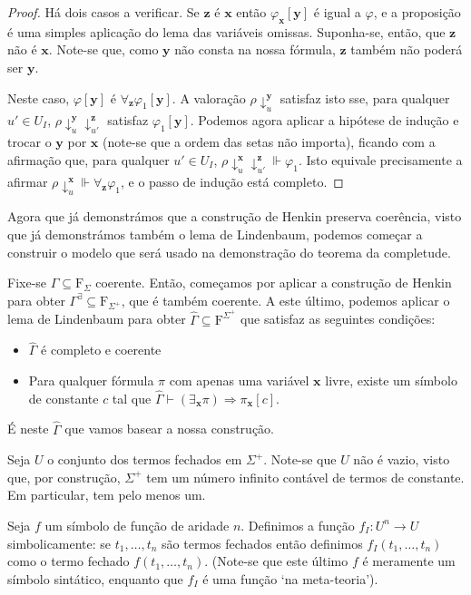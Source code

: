\documentclass{report}
\theoremstyle{definition}
\theoremstyle{remark}
\renewcommand{\bf}[1]{\mathbf{#1}}
\newcommand{\F}{\mathrm{F}}
\newcommand{\imply}{\mathbin{\Rightarrow}}
\begin{document}
\begin{proof}
	Há dois casos a verificar. Se $\bf z$ é $\bf x$ então $\varphi_{\bf x}[\bf y]$ é igual a $\varphi$, e a proposição é uma simples aplicação do lema das variáveis omissas. Suponha-se, então, que $\bf z$ não é $\bf x$. Note-se que, como $\bf y$ não consta na nossa fórmula, $\bf z$ também não poderá ser $\bf y$.

	Neste caso, $\varphi[\bf y]$ é $\forall_{\bf z} \varphi_1[\bf y]$. A valoração $\rho\!\downarrow^{\bf y}_u$ satisfaz isto sse, para qualquer $u' \in U_I$, $\rho\!\downarrow^{\bf y}_u\downarrow^{\bf z}_{u'}$ satisfaz $\varphi_1[\bf y]$. Podemos agora aplicar a hipótese de indução e trocar o $\bf y$ por $\bf x$ (note-se que a ordem das setas não importa), ficando com a afirmação que, para qualquer $u' \in U_I$, $\rho\!\downarrow^{\bf x}_u\downarrow^{\bf z}_{u'} \Vdash \varphi_1$. Isto equivale precisamente a afirmar $\rho\!\downarrow^{\bf x}_u \Vdash \forall_{\bf z} \varphi_1$, e o passo de indução está completo.	
	\end{proof}
	
	Agora que já demonstrámos que a construção de Henkin preserva coerência, visto que já demonstrámos também o lema de Lindenbaum, podemos começar a construir o modelo que será usado na demonstração do teorema da completude.
	
	Fixe-se $\Gamma \subseteq \F_\Sigma$ coerente. Então, começamos por aplicar a construção de Henkin para obter $\Gamma^\exists \subseteq \F_{\Sigma^+}$, que é também coerente. A este último, podemos aplicar o lema de Lindenbaum para obter $\widehat\Gamma \subseteq \F^{\Sigma^+}$ que satisfaz as seguintes condições:
	
	\begin{itemize}
	\item $\widehat\Gamma$ é completo e coerente
	
	\item Para qualquer fórmula $\pi$ com apenas uma variável $\bf x$ livre, existe um símbolo de constante $c$ tal que $\widehat\Gamma \vdash (\exists_{\bf x} \pi) \imply \pi_{\bf x}[c]$.
	\end{itemize}
	
	É neste $\widehat\Gamma$ que vamos basear a nossa construção.
	
	Seja $U$ o conjunto dos termos fechados em $\Sigma^+$. Note-se que $U$ não é vazio, visto que, por construção, $\Sigma^+$ tem um número infinito contável de termos de constante. Em particular, tem pelo menos um.
	
	Seja $f$ um símbolo de função de aridade $n$. Definimos a função $f_I : U^n \to U$ simbolicamente: se $t_1, \dots, t_n$ são termos fechados então definimos $f_I(t_1, \dots, t_n)$ como o termo fechado $f(t_1, \dots, t_n)$. (Note-se que este último $f$ é meramente um símbolo sintático, enquanto que $f_I$ é uma função `na meta-teoria').
	
\end{document}
